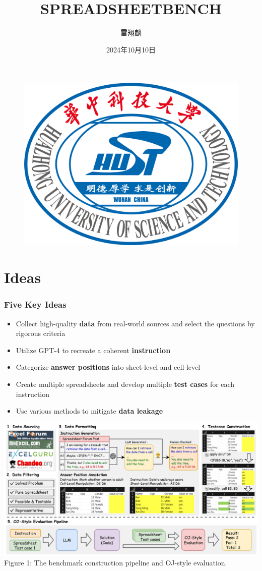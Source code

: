 \documentclass{beamer}
\author{雷翔麟}
\title{SPREADSHEETBENCH}
\institute{华中科技大学计算机科学与技术学院}
\date{2024年10月10日}
\begin{document}
\kaishu
\begin{frame}
    \titlepage
    \begin{figure}[htpb]
        \begin{center}
            \includegraphics[width=0.2\linewidth]{pic/HUST_LOGO.png}
        \end{center}
    \end{figure}
\end{frame}

\begin{frame}
    \tableofcontents[sectionstyle=show,subsectionstyle=show/shaded/hide,subsubsectionstyle=show/shaded/hide]
\end{frame}

\section{Ideas}

\begin{frame}
    \frametitle{Five Key Ideas}
    \begin{itemize}
        \item Collect high-quality \textbf{data} from real-world sources and select the questions by rigorous criteria
        \item Utilize GPT-4 to recreate a coherent \textbf{instruction}
        \item Categorize \textbf{answer positions} into sheet-level and cell-level
        \item Create multiple spreadsheets and develop multiple \textbf{test cases} for each instruction
        \item Use various methods to mitigate \textbf{data leakage}
    \end{itemize}
\end{frame}

\begin{frame}
    \centering
    \includegraphics[width=1\linewidth]{pic/construction pipeline.jpg}
    \vspace{0.2cm}
    {\footnotesize Figure 1: The benchmark construction pipeline and OJ-style evaluation.}
\end{frame}
\end{document}
